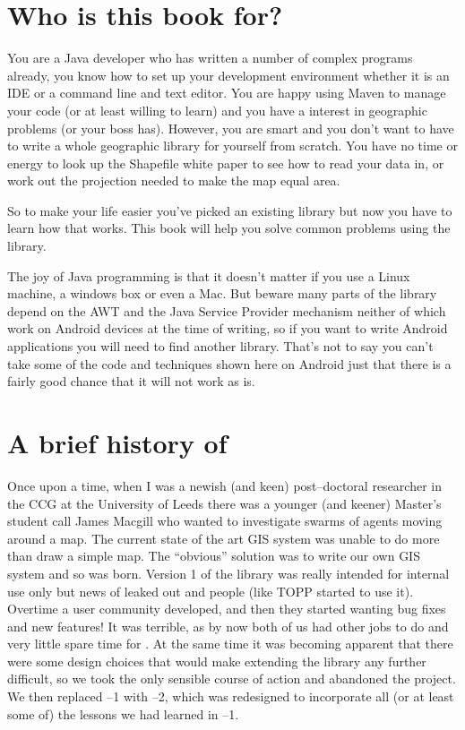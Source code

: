 \section{Who is this book for?}
You are a Java developer who has written a number of complex programs already, you know how to set up your development environment whether it is an IDE or a command line and text editor. You are happy using Maven to manage your code (or at least willing to learn) and you have a interest in geographic problems (or your boss has). However, you are smart and you don't want to have to write a whole geographic library for yourself from scratch. You have no time or energy to look up the Shapefile white paper \citep{ESRI1997} to see how to read your data in, or work out the projection needed to make the map equal area. 

So to make your life easier you've picked an existing library but now you have to learn how that works. This book will help you solve common problems using the \GeoTools library.

The joy of Java programming is that it doesn't matter if you use a Linux machine, a windows box or even a Mac. But beware many parts of the \GeoTools library depend on the AWT and the Java Service Provider mechanism neither of which work on Android devices at the time of writing, so if you want to write Android applications you will need to find another library. That's not to say you can't take some of the code and techniques shown here on Android just that there is a fairly good chance that it will not work as is.
 
\section{A brief history of \GeoTools}
Once upon a time, when I was a newish (and keen) post--doctoral researcher in the \ac{CCG} at the University of Leeds there was a younger (and keener) Master's student call James Macgill who wanted to investigate swarms of agents moving around a map. The current state of the art \ac{GIS} system was unable to do more than draw a simple map. The ``obvious'' solution was to write our own \ac{GIS} system and so \GeoTools was born. Version 1 of the library was really intended for internal use only but news of leaked out and people (like \ac{TOPP} started to use it). Overtime a user community developed, and then they started wanting bug fixes and new features! It was terrible, as by now both of us had other jobs to do and very little spare time for \GeoTools. At the same time it was becoming apparent that there were some design choices that would make extending the library any further difficult, so we took the only sensible course of action and abandoned the project. We then replaced \GeoTools--1 with \GeoTools--2, which was redesigned to incorporate all (or at least some of) the lessons we had learned in \GeoTools--1. 

